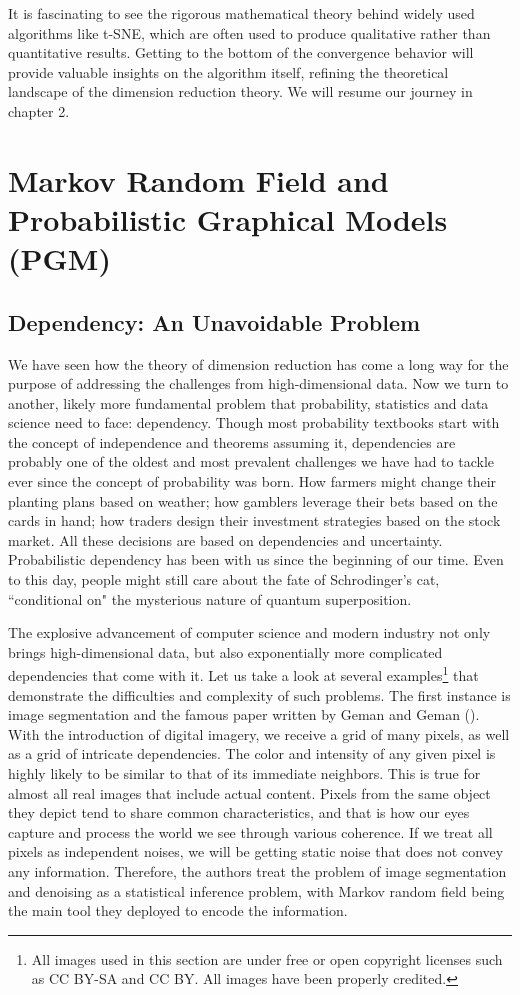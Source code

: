 It is fascinating to see the rigorous mathematical theory behind widely used
algorithms like t-SNE, which are often used to produce qualitative rather than
quantitative results. Getting to the bottom of the convergence behavior will
provide valuable insights on the algorithm itself, refining the theoretical
landscape of the dimension reduction theory. We will resume our journey in
chapter 2.

\section{Markov Random Field and Probabilistic Graphical Models (PGM)} \label{intro_chap:sec:MRF}
\subsection{Dependency: An Unavoidable Problem} \label{intro_chap:sec:MRF:intro}
We have seen how the theory of dimension reduction has come a long way for the
purpose of addressing the challenges from high-dimensional data. Now we turn to
another, likely more fundamental problem that probability, statistics and data
science need to face: dependency. Though most probability textbooks start
with the concept of independence and theorems assuming it, dependencies are
probably one of the oldest and most prevalent challenges we have had to tackle
ever since the concept of probability was born. How farmers might change their
planting plans based on weather; how gamblers leverage their bets based on the
cards in hand; how traders design their investment strategies based on the
stock market. All these decisions are based on dependencies and uncertainty.
Probabilistic dependency has been with us since the beginning of our time. Even
to this day, people might still care about the fate of Schrodinger's cat,
``conditional on" the mysterious nature of quantum superposition.

The explosive advancement of computer science and modern industry not only
brings high-dimensional data, but also exponentially more complicated
dependencies that come with it. Let us take a look at several
examples\footnote{All images used in this section are under free or open
    copyright licenses such as CC BY-SA and CC BY. All images have been properly
    credited.} that demonstrate the difficulties and complexity of such problems.
The first instance is image segmentation and the famous paper written by Geman
and Geman (\cite{Geman1984}). With the introduction of digital imagery, we
receive a grid of many pixels, as well as a grid of intricate dependencies. The
color and intensity of any given pixel is highly likely to be similar to that
of its immediate neighbors. This is true for almost all real images that
include actual content. Pixels from the same object they depict tend to share
common characteristics, and that is how our eyes capture and process the world
we see through various coherence. If we treat all pixels as independent noises,
we will be getting static noise that does not convey any information.
Therefore, the authors treat the problem of image segmentation and denoising as
a statistical inference problem, with Markov random field being the main tool
they deployed to encode the information.


